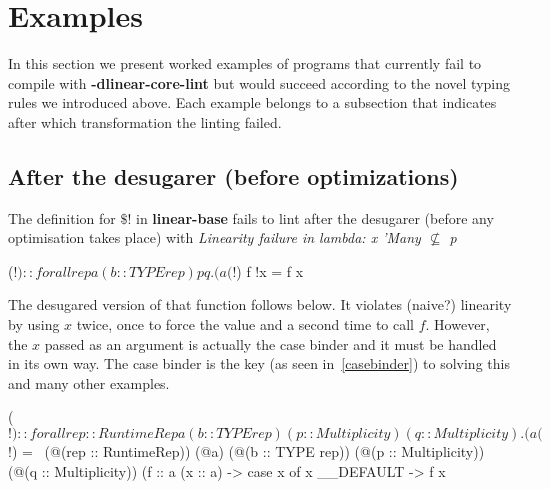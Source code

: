 \documentclass[a4paper, draft]{report}
\begin{document}






\section{Examples\label{examples}}

In this section we present worked examples of programs that currently fail to
compile with \textbf{-dlinear-core-lint} but would succeed according to the
novel typing rules we introduced above. Each example belongs to a subsection
that indicates after which transformation the linting failed.

\subsection{After the desugarer (before optimizations)}

The definition for $\$!$ in \textbf{linear-base}\cite{linearbase} fails to lint after the
desugarer (before any optimisation takes place) with \emph{Linearity failure in
lambda: x 'Many $\not\subseteq$ p}
\begin{code}
($!) :: forall {rep} a (b :: TYPE rep) p q. (a %
($!) f !x = f x
\end{code}

The desugared version of that function follows below. It violates (naive?)
linearity by using $x$ twice, once to force the value and a second time to call
$f$. However, the $x$ passed as an argument is actually the case binder and it
must be handled in its own way. The case binder is the key (as seen
in~\ref{casebinder}) to solving this
and many other examples.
\begin{code}
($!)
  :: forall {rep :: RuntimeRep} a (b :: TYPE rep) (p :: Multiplicity)
            (q :: Multiplicity).
     (a %
($!)
  = \ (@(rep :: RuntimeRep))
      (@a)
      (@(b :: TYPE rep))
      (@(p :: Multiplicity))
      (@(q :: Multiplicity))
      (f :: a %
      (x :: a) ->
      case x of x { __DEFAULT -> f x }
\end{code}
\end{document}
